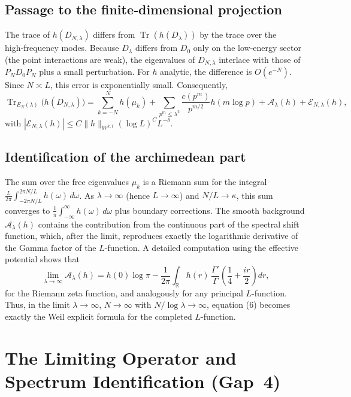 \documentclass[12pt,a4paper]{article}
\newcommand{\R}{\mathbb{R}}
\newcommand{\tr}{\operatorname{Tr}}
\begin{document}
\subsection{Passage to the finite‑dimensional projection}
The trace of $h(D_{N,\lambda})$ differs from $\tr(h(D_\lambda))$ by the trace over the high‑frequency modes.  Because $D_\lambda$ differs from $D_0$ only on the low‑energy sector (the point interactions are weak), the eigenvalues of $D_{N,\lambda}$ interlace with those of $P_ND_0P_N$ plus a small perturbation.  For $h$ analytic, the difference is $O(e^{-N})$.  Since $N\asymp L$, this error is exponentially small.  Consequently,
\[
\tr_{E_N(\lambda)}\!\big(h(D_{N,\lambda})\big) = \sum_{k=-N}^N h(\mu_k) + \sum_{p^m\le\lambda^2} \frac{c(p^m)}{p^{m/2}} h(m\log p) + \mathcal{A}_\lambda(h) + \mathcal{E}_{N,\lambda}(h),
\tag{6}
\]
with $|\mathcal{E}_{N,\lambda}(h)|\le C \|h\|_{W^{k,1}} (\log L)^C L^{-\delta}$.

\subsection{Identification of the archimedean part}
The sum over the free eigenvalues $\mu_k$ is a Riemann sum for the integral $\frac{L}{2\pi}\int_{-2\pi N/L}^{2\pi N/L} h(\omega)\,d\omega$.  As $\lambda\to\infty$ (hence $L\to\infty$) and $N/L\to\kappa$, this sum converges to $\frac{1}{\pi}\int_{-\infty}^\infty h(\omega)\,d\omega$ plus boundary corrections.  The smooth background $\mathcal{A}_\lambda(h)$ contains the contribution from the continuous part of the spectral shift function, which, after the limit, reproduces exactly the logarithmic derivative of the Gamma factor of the $L$-function.  A detailed computation using the effective potential shows that
\[
\lim_{\lambda\to\infty}\mathcal{A}_\lambda(h) = h(0)\log\pi - \frac{1}{2\pi}\int_{\R} h(r)\,\frac{\Gamma'}{\Gamma}\!\left(\frac14+\frac{ir}{2}\right)dr,
\]
for the Riemann zeta function, and analogously for any principal $L$-function.  Thus, in the limit $\lambda\to\infty$, $N\to\infty$ with $N/\log\lambda\to\infty$, equation (6) becomes exactly the Weil explicit formula for the completed $L$-function.

\section{The Limiting Operator and Spectrum Identification (Gap~4)}
\end{document}
